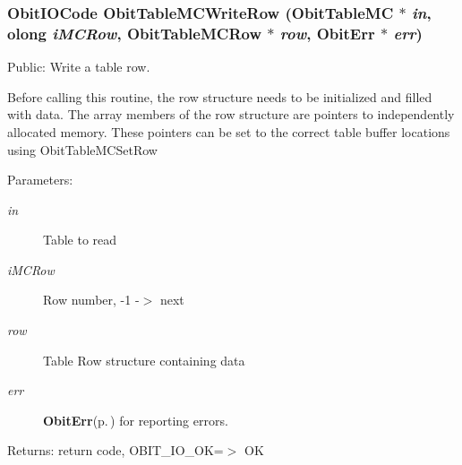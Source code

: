 \subsubsection{\setlength{\rightskip}{0pt plus 5cm}Obit\-IOCode Obit\-Table\-MCWrite\-Row ({\bf Obit\-Table\-MC} $\ast$ {\em in}, {\bf olong} {\em i\-MCRow}, {\bf Obit\-Table\-MCRow} $\ast$ {\em row}, {\bf Obit\-Err} $\ast$ {\em err})}\label{ObitTableMC_8c_a24}


Public: Write a table row. 

Before calling this routine, the row structure needs to be initialized and filled with data. The array members of the row structure are pointers to independently allocated memory. These pointers can be set to the correct table buffer locations using Obit\-Table\-MCSet\-Row \begin{Desc}
\item[Parameters:]
\begin{description}
\item[{\em in}]Table to read \item[{\em i\-MCRow}]Row number, -1 -$>$ next \item[{\em row}]Table Row structure containing data \item[{\em err}]{\bf Obit\-Err}{\rm (p.\,\pageref{structObitErr})} for reporting errors. \end{description}
\end{Desc}
\begin{Desc}
\item[Returns:]return code, OBIT\_\-IO\_\-OK=$>$ OK \end{Desc}
